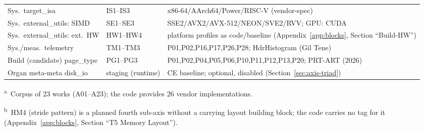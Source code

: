 \begin{nurkurz}
\begin{table}[!htbp]
\begin{tabular}{@{}l l p{6.8cm}@{}}
    \midrule
    Sys.\ target\_isa & IS1--IS3 & x86-64/AArch64/Power/RISC-V (vendor-spec) \\
    Sys.\ external\_utils: SIMD & SE1--SE3 & SSE2/AVX2/AVX-512/NEON/SVE2/RVV\@; GPU\@: CUDA \\
    Sys.\ external\_utils: ext.\ HW & HW1--HW4 & platform profiles as code/baseline (Appendix~\ref{app:blocks}, Section \enquote{Build-HW}) \\
    Sys./meas.\ telemetry & TM1--TM3 & P01,P02,P16,P17,P26,P28; HdrHistogram (Gil Tene) \\
    Build (candidate) page\_type & PG1--PG3 & P01,P02,P04,P05,P06,P10,P11,P12,P13,P20; PRT-ART (2026) \\
    Organ meta-meta disk\_io & staging (runtime) & CE baseline; optional, disabled (Section~\ref{sec:axis-triad}) \\
    \bottomrule
  \end{tabular}

  \smallskip
  {\footnotesize \textsuperscript{a}~Corpus of 23 works (A01--A23); the code provides 26 vendor implementations.\par}
  {\footnotesize \textsuperscript{b}~HM4 (stride pattern) is a planned fourth sub-axis without a carrying layout building block; the code carries no tag for it (Appendix~\ref{app:blocks}, Section \enquote{T5 Memory Layout}).\par}
\end{table}
\end{nurkurz}

